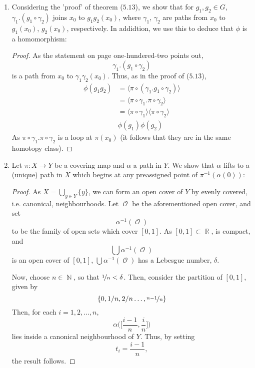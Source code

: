 \documentclass{book}
\DeclareMathOperator*{\R}{\mathbb{R}}
\DeclareMathOperator*{\N}{\mathbb{N}}
\DeclareMathOperator*{\Ocal}{\mathcal{O}}
\newcommand\innerone[1]{\langle #1 \rangle}
\begin{document}
\begin{enumerate}[(1)]
    \item Considering the 'proof' of theorem ($5.13$), we show that for $g_1, g_2 \in G$, $\gamma_1.(g_1 \circ \gamma_2)$ joins $x_0$ to $g_1g_2(x_0)$, where $\gamma_1$, $\gamma_2$ are paths from $x_0$ to $g_1(x_0)$, $g_2(x_0)$, respectively. In addidtion, we use this to deduce that $\phi$ is a homomorphism: 
        \begin{proof} As the statement on page one-hundered-two points out, 
            \[\gamma_1.(g_1 \circ \gamma_2)\]
            is a path from $x_0$ to $\gamma_1\gamma_2(x_0)$.
            Thus, as in the proof of ($5.13$), 
            \begin{align*}
                \phi(g_1g_2) & = \innerone{\pi \circ (\gamma_1. g_1 \circ \gamma_2) } \\
                & = \innerone{\pi \circ \gamma_1. \pi \circ \gamma_2} \\
                & = \innerone{\pi \circ \gamma_1} \innerone{\pi \circ \gamma_2} \\
                & \phi(g_1) \phi(g_2) 
            \end{align*}
            As $\pi \circ \gamma_1. \pi \circ \gamma_2$ is a loop at $\pi(x_0)$ (it follows that they are in the same homotopy class). 
        \end{proof}

    \item Let $\pi: X \rightarrow Y$ be a covering map and $\alpha$ a path in $Y$. We show that $\alpha$ lifts to a (unique) path in $X$ which begins at any preassigned point of $\pi^{-1}(\alpha(0))$: 
        \begin{proof} As $X = \bigcup_{y \in Y} \{y\}$, we can form an open cover of $Y$ by evenly covered, i.e. canonical, neighbourhoods. Let $\Ocal$ be the aforementioned open cover, and set 
            \[\alpha^{-1}(\Ocal)\]
            to be the family of open sets which cover $[0,1]$. As $[0,1] \subset \R$, is compact, and 
            \[\bigcup \alpha^{-1}(\Ocal)\]
            is an open cover of $[0,1]$, $\bigcup \alpha^{-1}(\Ocal)$ has a Lebesgue number, $\delta$. 
            \par Now, choose $n \in \N$, so that $\nicefrac{1}{n} < \delta$. Then, consider the partition of $[0,1]$, given by 
            \[\{0,1/n, 2/n \dots , \nicefrac{n-1}{n}\}\]
            Then, for each $i = 1, 2, \dots, n$, 
            \[\alpha\Big(\Big[\frac{i-1}{n}, \frac{i}{n}\Big]\Big)\]
            lies inside a canonical neighbourhood of $Y$. Thus, by setting 
            \[t_i = \frac{i-1}{n},\]
            the result follows. 
        \end{proof}


\end{enumerate}
\end{document}
